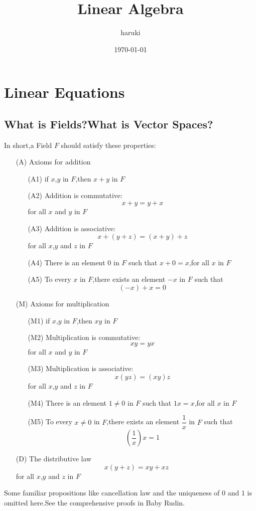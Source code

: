 \documentclass{article}
\title{Linear Algebra}
\author{haruki}
\date{\today}
\begin{document}
\maketitle
\tableofcontents
\section{Linear Equations}
\subsection{What is Fields?What is Vector Spaces?}
\noindent In short,a Field $F$ should satisfy these properties:
\begin{enumerate}
	\item[(A)] Axioms for addition
	\begin{enumerate}
		\item[(A1)] if $x$,$y$ in $F$,then $x+y$ in $F$
	    \item[(A2)] Addition is commutative:\[x+y=y+x\]for all $x$ and $y$ in $F$
	    \item[(A3)] Addition is associative:\[x+(y+z)=(x+y)+z\]for all $x$,$y$ and $z$ in $F$
	    \item[(A4)] There is an element $0$ in $F$ such that $x+0=x$,for all $x$ in $F$
	    \item[(A5)] To every $x$ in $F$,there exists an element $-x$ in $F$ such that \[(-x)+x=0\]
	\end{enumerate}
	\item[(M)] Axioms for multiplication
	\begin{enumerate}
		\item[(M1)] if $x$,$y$ in $F$,then $xy$ in $F$
		\item[(M2)] Multiplication is commutative:\[xy=yx\]for all $x$ and $y$ in $F$
		\item[(M3)] Multiplication is associative:\[x(yz)=(xy)z\]for all $x$,$y$ and $z$ in $F$
		\item[(M4)] There is an element $1\neq 0$ in $F$ such that $1x=x$,for all $x$ in $F$
		\item[(M5)] To every $x\neq 0$ in $F$,there exists an element $\dfrac{1}{x}$ in $F$ such that \[(\frac{1}{x})x=1\]
	\end{enumerate}
	\item[(D)] The distributive law\[x(y+z)=xy+xz\]for all $x$,$y$ and $z$ in $F$
\end{enumerate}
\indent Some familiar propositions like cancellation law and the uniqueness of $0$ and $1$ is omitted here.See the comprehensive proofs in Baby Rudin.\\
\end{document}
